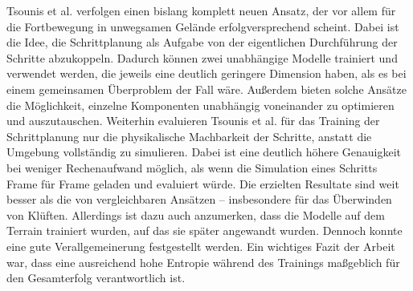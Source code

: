 

Tsounis et al. \cite{tsounis2020deepgait} verfolgen einen bislang komplett neuen Ansatz, der vor allem für die Fortbewegung in unwegsamen Gelände erfolgversprechend scheint.
Dabei ist die Idee, die Schrittplanung als Aufgabe von der eigentlichen Durchführung der Schritte abzukoppeln.
Dadurch können zwei unabhängige Modelle trainiert und verwendet werden, die jeweils eine deutlich geringere Dimension haben, als es bei einem gemeinsamen Überproblem der Fall wäre.
Außerdem bieten solche Ansätze die Möglichkeit, einzelne Komponenten unabhängig voneinander zu optimieren und auszutauschen.
Weiterhin evaluieren Tsounis et al. für das Training der Schrittplanung nur die physikalische Machbarkeit der Schritte, anstatt die Umgebung vollständig zu simulieren.
Dabei ist eine deutlich höhere Genauigkeit bei weniger Rechenaufwand möglich, als wenn die Simulation eines Schritts Frame für Frame geladen und evaluiert würde.
Die erzielten Resultate sind weit besser als die von vergleichbaren Ansätzen -- insbesondere für das Überwinden von Klüften.
Allerdings ist dazu auch anzumerken, dass die Modelle auf dem Terrain trainiert wurden, auf das sie später angewandt wurden.
Dennoch konnte eine gute Verallgemeinerung festgestellt werden.
Ein wichtiges Fazit der Arbeit war, dass eine ausreichend hohe Entropie während des Trainings maßgeblich für den Gesamterfolg verantwortlich ist.


